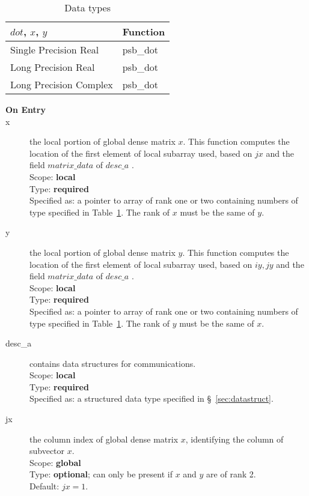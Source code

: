 \begin{table}[h]
\begin{center}
\begin{tabular}{ll}
\hline
$dot$, $x$, $y$ & {\bf Function}\\
\hline
Single Precision Real & psb\_dot\\
Long Precision Real & psb\_dot \\
Long Precision Complex & psb\_dot \\	
\hline
\end{tabular}
\end{center}
\caption{Data types\label{tab:f90dot}}
\end{table}

\begin{description}
\item[\bf On Entry]
\item[x] the local portion of global dense matrix
$x$. This function computes the location of the first element of
local subarray used, based on $jx$ and the field $matrix\_data$ of $desc\_a$ . \\
Scope: {\bf local} \\
Type: {\bf required} \\
Specified as: a pointer to array of rank one or two
containing numbers of type specified in
Table~\ref{tab:f90dot}. The rank of $x$ must be the same of $y$. 
\item[y] the local portion of global dense matrix
$y$. This function computes the location of the first element of
local subarray used, based on $iy, jy$ and the field $matrix\_data$ of $desc\_a$ . \\
Scope: {\bf local} \\
Type: {\bf required} \\
Specified as: a pointer to array of rank one or two
containing numbers of type specified in
Table~\ref{tab:f90dot}. The rank of $y$ must be the same of $x$. 
\item[desc\_a] contains data structures for communications.\\
Scope: {\bf local} \\
Type: {\bf required}\\
Specified as: a structured data type specified in
\S~\ref{sec:datastruct}.
\item[jx]  the column index of global dense matrix $x$,
identifying the column of subvector $x$.\\
Scope: {\bf global} \\
Type: {\bf optional}; can only be present if $x$ and $y$ are of rank 2.\\
Default: $jx = 1$.\\


\end{description}
